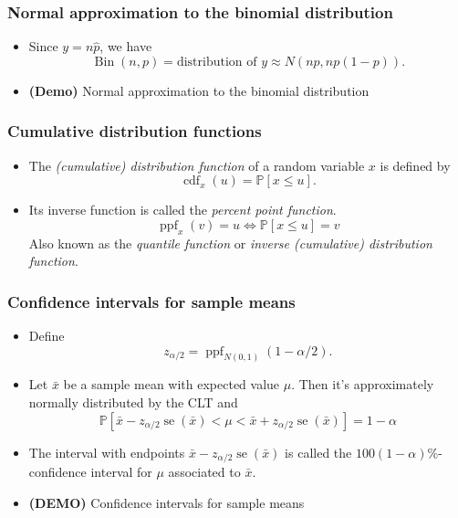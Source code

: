 \documentclass{beamer}
\DeclareMathOperator{\stderr}{se}
\DeclareMathOperator{\Bin}{Bin}
\DeclareMathOperator{\CDF}{cdf}
\DeclareMathOperator{\PPF}{ppf}
\begin{document}
\begin{frame}
    \frametitle{Normal approximation to the binomial distribution}
    
    \begin{itemize}
        \item Since $y=n\hat{p}$, we have
        \[
        \Bin(n, p) = \text{distribution of $y$}\approx
        N\left(np, np(1-p)\right).
        \]

        \item \textbf{(Demo)} Normal approximation to the binomial distribution
    \end{itemize}
\end{frame}

\begin{frame}
    \frametitle{Cumulative distribution functions}

    \begin{itemize}
        \item The \emph{(cumulative) distribution function} of a random variable $x$ is defined by
        \[
            \CDF_x(u) = \mathbb{P}[x\leq u].
        \]

        \item Its inverse function is called the \emph{percent point function}.
        \[
        \PPF_x(v) = u\Longleftrightarrow \mathbb{P}[x\leq u] = v 
        \]
        Also known as the \emph{quantile function} or \emph{inverse (cumulative) distribution function}.
    \end{itemize}    
\end{frame}

\begin{frame}
    \frametitle{Confidence intervals for sample means}

    \begin{itemize}
        \item Define
        \[
        z_{\alpha/2} = \PPF_{N(0, 1)}(1 - \alpha/2).
        \]

        \item Let $\bar{x}$ be a sample mean with expected value $\mu$. Then it's approximately normally distributed by the CLT and 
        $$
        \mathbb{P}[\bar{x} - z_{\alpha/2}\stderr(\bar{x}) < \mu < \bar{x} + z_{\alpha/2}\stderr(\bar{x})] = 1-\alpha
        $$

        \item The interval with endpoints $\bar{x} - z_{\alpha/2}\stderr(\bar{x})$ is called the
        $100(1-\alpha)\%$-confidence interval for $\mu$ associated to $\bar{x}$.

        \item \textbf{(DEMO)} Confidence intervals for sample means
    \end{itemize}
\end{frame}
\end{document}

